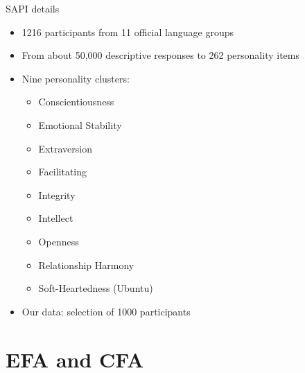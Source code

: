 \documentclass[10pt]{beamer}\usepackage[]{graphicx}\usepackage[]{xcolor}
\begin{document}
\begin{frame}{SAPI details}
	\begin{itemize}
		\item 1216 participants from 11 official language groups
		\item From about 50,000 descriptive responses to 262 personality items
		\item Nine personality clusters: 
		\begin{itemize}
			\item Conscientiousness
			\item Emotional Stability
			\item Extraversion
			\item Facilitating
			\item Integrity
			\item Intellect
			\item Openness
			\item Relationship Harmony
			\item Soft-Heartedness (Ubuntu)
		\end{itemize}
		\item Our data: selection of 1000 participants
	\end{itemize}
\end{frame}


\section{EFA and CFA}
%

\end{document}
